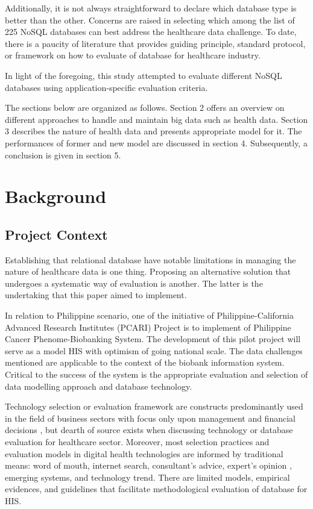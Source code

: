 \documentclass[5p]{elsarticle}
\begin{document}
Additionally, it is not always straightforward to declare which database type is better than the other. Concerns are raised in selecting which among the list of 225 NoSQL databases \cite{S.Edlich2018} 
can best address the healthcare data challenge. To date, there is a paucity of literature that provides guiding principle, standard protocol, or framework on how to
evaluate of database for healthcare industry.

In light of the foregoing, this study attempted to evaluate different NoSQL databases using application-specific evaluation criteria. 

The sections below are organized as follows.
Section 2 offers an overview on different approaches to handle and maintain big data such as health data. 
Section 3 describes the nature of health data and presents appropriate model for it.
The performances of former and new model are discussed in section 4. 
Subsequently, a conclusion is given in section 5.

\section{Background}
\subsection{Project Context}
Establishing that relational database have notable limitations in managing the nature of healthcare data \cite{Z.Goli-Malekabadi201675,K.Lee201299,H.Al-Fatlawi2015122,O.Schmitt20121,Y.Jin2011288} is one thing. 
Proposing an alternative solution that undergoes a systematic way of evaluation is another. The latter is the undertaking that this paper aimed to implement.

In relation to Philippine scenario, one of the initiative of Philippine-California Advanced Research Institutes (PCARI) Project is to implement 
of Philippine Cancer Phenome-Biobanking System. The development of this pilot project will serve as a model HIS with optimism 
of going national scale. The data challenges mentioned are applicable to the context of the biobank information system. 
Critical to the success of the system is the appropriate evaluation and selection of data modelling approach and database technology.


Technology selection or evaluation framework are constructs predominantly used in the field of business sectors with focus only upon management and financial 
decisions \cite{C.Chan2010300}, but dearth of source exists when discussing technology or database evaluation for healthcare sector. Moreover, most selection 
practices and evaluation models in digital health technologies are informed by traditional means: word of mouth, internet search, consultant’s advice, expert’s opinion \cite{A.Ostrovsky20141}, 
emerging systems, and technology trend. There are limited models, empirical evidences, and guidelines that facilitate methodological evaluation of database for HIS. 
\end{document}

